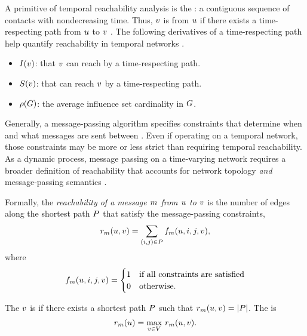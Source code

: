 A primitive of temporal reachability analysis is the : a contiguous sequence of contacts with nondecreasing time. Thus, \vertexName $v$ is  from \vertexName $u$ if there exists a time-respecting path from $u$ to $v$ \citep{Moody2002}. The following derivatives of a time-respecting path help quantify reachability in temporal networks \citep{Holme2012}.
\begin{itemize}
  \item {} $I(v)$: \verticesName that $v$ can reach by a time-respecting path.
  \item {} $S(v)$: \verticesName that can reach $v$ by a time-respecting path.
  \item {} $\rho(G)$: the average influence set cardinality in $G$.
\end{itemize}
Generally, a message-passing algorithm specifies constraints that determine when and what messages are sent between \verticesName. Even if operating on a temporal network, those constraints may be more or less strict than requiring temporal reachability. As a dynamic process, message passing on a time-varying network requires a broader definition of reachability that accounts for network topology \emph{and} message-passing semantics \citep{Barrat2013}.

Formally, the \emph{reachability of a message $m$ from \vertexName $u$ to \vertexName $v$} is the number of edges along the shortest path $P$ that satisfy the message-passing constraints,
\begin{equation*}
  r_m(u, v) = \sum_{(i, j) \in P} f_m(u, i, j, v),
\end{equation*}
where
\begin{equation*}
  f_m(u, i, j, v) = 
    \begin{cases}
      1 & \text{if all constraints are satisfied} \\ 
      0 & \text{otherwise.}
    \end{cases}
\end{equation*}

The \vertexName $v$ is  if there exists a shortest path $P$ such that $r_m(u, v) = \left\vert P \right\vert$. The  is
\begin{equation}\label{eq:vreach}
  r_m(u) = \max_{v \in V} \, r_m(u, v).
\end{equation}

